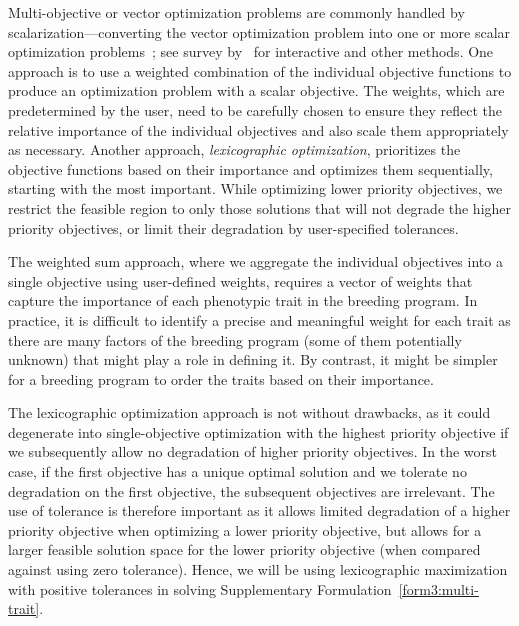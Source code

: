 \documentclass[12pt, a4paper, bibliography=totoc]{scrartcl}
\begin{document}
 Multi-objective or vector optimization problems are commonly handled by scalarization---converting the vector optimization problem into one or more scalar optimization problems~\citep{miettinen2012nonlinear,sawaragi1985theory}; see survey by~\cite{Miettinen2016} for interactive and other methods. 
One approach is to use a weighted combination of the individual objective functions to produce an optimization problem with a scalar objective. The weights, which are predetermined by the user, need to be carefully chosen to ensure they reflect the relative importance of the individual objectives and also scale them appropriately as necessary. Another approach, \textit{lexicographic optimization}, prioritizes the objective functions based on their importance and optimizes them sequentially, starting with the most important. While optimizing lower priority objectives, we restrict the feasible region to only those solutions that will not degrade the higher priority objectives, or limit their degradation by user-specified tolerances. 

The  weighted sum approach, where we aggregate the individual objectives into a single objective using user-defined weights,   requires a vector of weights that capture the importance of each phenotypic trait in the breeding program. In practice, it is difficult to identify a precise and meaningful weight for each trait as there are many factors of the breeding program (some of them potentially unknown) that might play a role in defining it. By contrast, it might be simpler for a breeding program to order the traits based on their importance. 

The lexicographic optimization approach is not without drawbacks, as it could degenerate into single-objective optimization with the highest priority objective if we subsequently allow no degradation of higher priority objectives. In the worst case, if the first objective has a unique optimal solution and we tolerate no degradation on the first objective, the subsequent objectives are  irrelevant. The use of tolerance is therefore important as it allows limited degradation of a higher priority objective when optimizing a lower priority objective, but allows for a larger feasible solution space for the lower priority objective (when compared against using zero  tolerance).  Hence, we will be using lexicographic maximization with positive tolerances in solving Supplementary Formulation~\eqref{form3:multi-trait}.
\end{document}
